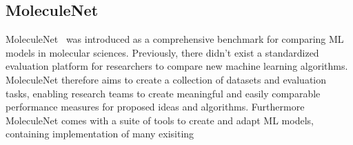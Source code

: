 \subsection{MoleculeNet}

MoleculeNet~\cite{2018moleculenet} was introduced as a comprehensive benchmark for comparing ML models in molecular sciences. Previously, there didn't exist a standardized evaluation platform for researchers to compare new machine learning algorithms. MoleculeNet therefore aims to create a collection of datasets and evaluation tasks, enabling research teams to create meaningful and easily comparable performance measures for proposed ideas and algorithms. Furthermore MoleculeNet comes with a suite of tools to create and adapt ML models, containing implementation of many exisiting 
